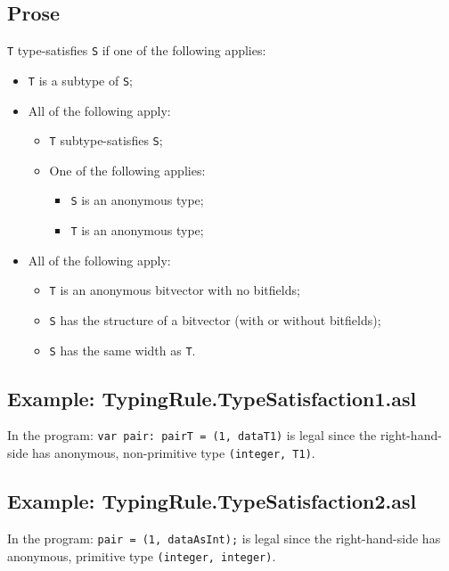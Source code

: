 \documentclass{book}
\begin{document}
\subsection{Prose}
 
\texttt{T} type-satisfies \texttt{S} if one of the following applies:
 \begin{itemize}
 \item \texttt{T} is a subtype of \texttt{S};
 \item All of the following apply:
    \begin{itemize}
    \item \texttt{T} subtype-satisfies \texttt{S};
    \item One of the following applies:
      \begin{itemize}
      \item \texttt{S} is an anonymous type;
      \item \texttt{T} is an anonymous type;
      \end{itemize}
    \end{itemize}
  \item All of the following apply:
    \begin{itemize}
    \item \texttt{T} is an anonymous bitvector with no bitfields;
    \item \texttt{S} has the structure of a bitvector (with or without bitfields);
    \item \texttt{S} has the same width as \texttt{T}.
    \end{itemize}
  \end{itemize}

\subsection{Example: TypingRule.TypeSatisfaction1.asl}
    In the program:
    \texttt{var pair: pairT = (1, dataT1)} is legal since the right-hand-side has
    anonymous, non-primitive type \texttt{(integer, T1)}.

\subsection{Example: TypingRule.TypeSatisfaction2.asl}
    In the program:
    \texttt{pair = (1, dataAsInt);} is legal since the right-hand-side has anonymous,
    primitive type \texttt{(integer, integer)}.
 
\end{document}
